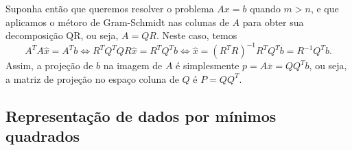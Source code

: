 Suponha então que queremos resolver o problema $Ax=b$ quando $m>n$, e que aplicamos o métoro de Gram-Schmidt nas colunas de $A$ para obter sua decomposição QR, ou seja, $A=QR$. Neste caso, temos
\begin{equation*}
   A^TA\hat{x} = A^Tb \Leftrightarrow R^TQ^TQR\hat{x}=R^TQ^Tb \Leftrightarrow \hat{x} = (R^TR)^{-1}R^TQ^Tb = R^{-1}Q^Tb.
\end{equation*}
Assim, a projeção de $b$ na imagem de $A$ é simplesmente $p = A\overline{x} = QQ^Tb$, ou seja, a matriz de projeção no espaço coluna de $Q$ é $P=QQ^T$.

\subsection{Representação de dados por mínimos quadrados}

